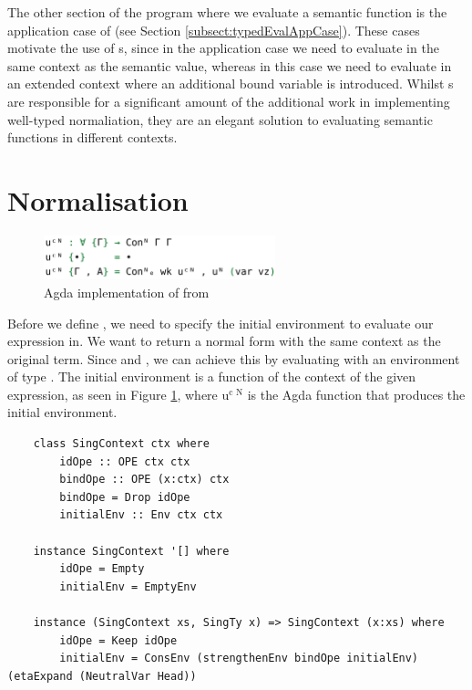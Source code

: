 The other section of the program where we evaluate a semantic function  is the application case of  (see Section \ref{subsect:typedEvalAppCase}). These cases motivate the use of s, since in the application case we need to evaluate  in the same context as the semantic value, whereas in this case we need to evaluate  in an extended context where an additional bound variable is introduced. Whilst s are responsible for a significant amount of the additional work in implementing well-typed normaliation, they are an elegant solution to evaluating semantic functions in different contexts.



\section{Normalisation}
\label{sect:typedNormalisation}

\begin{figure}[h]
    \centering
    \includegraphics[width=0.6\textwidth]{./images/agda_initial_env.png}
    \caption{Agda implementation of  from \cite{AgdaNbe}}
    \label{fig:agdaInitialEnv}
\end{figure}

Before we define , we need to specify the initial environment to evaluate our expression in. We want  to return a normal form with the same context as the original term. Since  and , we can achieve this by evaluating with an environment of type . The initial environment is a function of the context of the given expression, as seen in Figure \ref{fig:agdaInitialEnv}, where $\text{u}^\text{c N}$ is the Agda function that produces the initial environment.

\begin{lstlisting}
    class SingContext ctx where
        idOpe :: OPE ctx ctx
        bindOpe :: OPE (x:ctx) ctx
        bindOpe = Drop idOpe
        initialEnv :: Env ctx ctx

    instance SingContext '[] where
        idOpe = Empty
        initialEnv = EmptyEnv

    instance (SingContext xs, SingTy x) => SingContext (x:xs) where
        idOpe = Keep idOpe
        initialEnv = ConsEnv (strengthenEnv bindOpe initialEnv) (etaExpand (NeutralVar Head))
\end{lstlisting}

